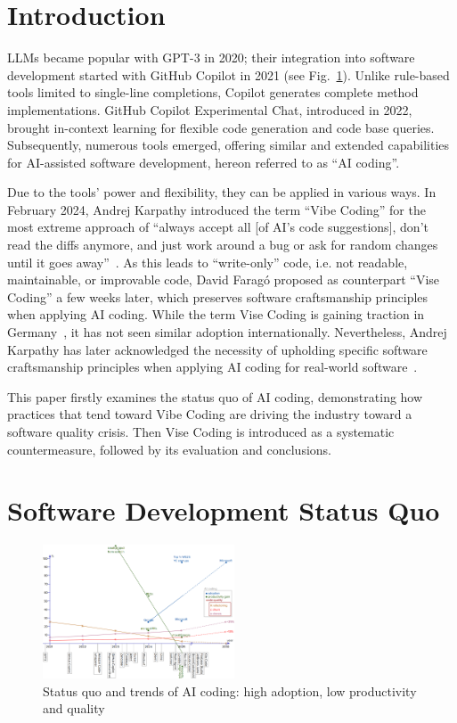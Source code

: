 \documentclass[twocolumn]{article}
\begin{document}
\section{Introduction}

LLMs became popular with GPT-3 in 2020;
their integration into software development started with GitHub Copilot in 2021 (see Fig.~\ref{fig:statusquo}). 
Unlike rule-based tools limited to single-line completions, Copilot generates complete method implementations.
GitHub Copilot Experimental Chat, introduced in 2022,
brought in-context learning for flexible code generation and code base queries. 
Subsequently, numerous tools emerged, offering similar and extended capabilities for
AI-assisted software development, hereon referred to as ``AI coding''.

Due to the tools' power and flexibility, they can be applied in various ways.
In February 2024, Andrej Karpathy introduced the term ``Vibe Coding'' for the most extreme approach of
``always accept all [of AI's code suggestions], don't read the diffs anymore, and just work around a bug
or ask for random changes until it goes away''~\cite{AK25}.
As this leads to ``write-only'' code, i.e. not readable, maintainable, or improvable code,
David Farag\'{o} proposed as counterpart ``Vise Coding'' a few weeks later,  
which preserves software craftsmanship principles when applying AI coding.
While the term Vise Coding is gaining traction in Germany~\cite{URL:ViseWikipediaDe},
it has not seen similar adoption internationally.
Nevertheless, Andrej Karpathy has later acknowledged the necessity of upholding
specific software craftsmanship principles when applying AI coding for real-world software~\cite{AK25c,AK25b}.

This paper firstly examines the status quo of AI coding,
demonstrating how practices that tend toward Vibe Coding are driving the industry toward a software quality crisis. 
Then Vise Coding is introduced as a systematic countermeasure, followed by its evaluation and conclusions.

\section{Software Development Status Quo}

\begin{figure}[hbt!]
  \vspace{-4mm}
  \hspace{-2.5mm}
  \includegraphics[width=0.507\textwidth]{figures/allStats_v4}
  \vspace{-7mm}
\caption{Status quo and trends of AI coding: high adoption, low productivity and quality}
\label{fig:statusquo}
\end{figure}
\end{document}
